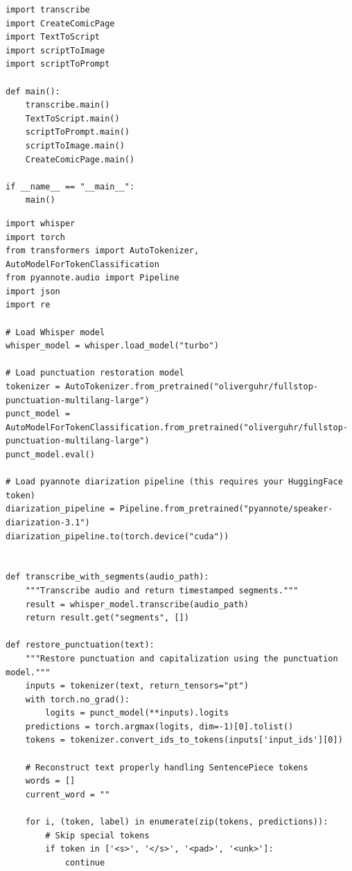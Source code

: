 \begin{lstlisting}[style=pythonstyle, caption={app.py}, label={lst:app.py}]
import transcribe
import CreateComicPage
import TextToScript
import scriptToImage
import scriptToPrompt

def main():
    transcribe.main()
    TextToScript.main()
    scriptToPrompt.main()
    scriptToImage.main()
    CreateComicPage.main()

if __name__ == "__main__":
    main()
\end{lstlisting}

\begin{lstlisting}[style=pythonstyle, caption={transcribe.py}, label={lst:transcribe.py}]
import whisper
import torch
from transformers import AutoTokenizer, AutoModelForTokenClassification
from pyannote.audio import Pipeline
import json
import re

# Load Whisper model
whisper_model = whisper.load_model("turbo")

# Load punctuation restoration model
tokenizer = AutoTokenizer.from_pretrained("oliverguhr/fullstop-punctuation-multilang-large")
punct_model = AutoModelForTokenClassification.from_pretrained("oliverguhr/fullstop-punctuation-multilang-large")
punct_model.eval()

# Load pyannote diarization pipeline (this requires your HuggingFace token)
diarization_pipeline = Pipeline.from_pretrained("pyannote/speaker-diarization-3.1")
diarization_pipeline.to(torch.device("cuda"))


def transcribe_with_segments(audio_path):
    """Transcribe audio and return timestamped segments."""
    result = whisper_model.transcribe(audio_path)
    return result.get("segments", [])

def restore_punctuation(text):
    """Restore punctuation and capitalization using the punctuation model."""
    inputs = tokenizer(text, return_tensors="pt")
    with torch.no_grad():
        logits = punct_model(**inputs).logits
    predictions = torch.argmax(logits, dim=-1)[0].tolist()
    tokens = tokenizer.convert_ids_to_tokens(inputs['input_ids'][0])

    # Reconstruct text properly handling SentencePiece tokens
    words = []
    current_word = ""
    
    for i, (token, label) in enumerate(zip(tokens, predictions)):
        # Skip special tokens
        if token in ['<s>', '</s>', '<pad>', '<unk>']:
            continue
            

\end{lstlisting}
